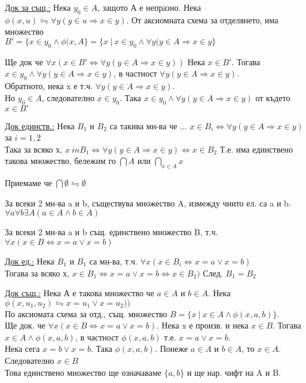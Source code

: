 \documentclass[fleqn, titlepage, 12pt]{report}
\begin{document}
\underline{Док за същ.:} Нека $y_0 \in A$, защото А е непразно. Нека
$\phi(x,u) \leftrightharpoons \forall{y}(y \in u \Rightarrow x \in y)$.
От аксиомната схема за отделянето, има множество\\
$B' = \{x \in y_0 \land \phi(x,A\} = \{x\ |\ x\in y_0 \land \forall{y}(y \in A \Rightarrow x \in y\}$

Ще док че $\forall{x}(x \in B' \Leftrightarrow \forall{y}(y \in A \Rightarrow x \in y))$
Нека $x \in B'$. Тогава $x \in y_0 \land \forall{y}(y \in A \Rightarrow x \in y)$,
в частност $ \forall{y}(y \in A \Rightarrow x \in y)$.\\
Обратното, нека x е т.ч. $ \forall{y}(y \in A  \Rightarrow x \in y)$.\\
Но $y_0 \in A$, следователно $x \in y_0$. Така $x \in y_0 \land \forall{y}(y \in A \Rightarrow x \in y)$
от където $x \in B'$
\bigbreak

\underline{Док единств.:} Нека $B_1$ и $B_2$ са такива мн-ва че ...
$ x \in B_i \Leftrightarrow \forall{y}(y \in A \Rightarrow x \in y)$ за $i = 1,2$\\
Така за всяко х, $ x\ in B_1 \Leftrightarrow \forall{y}(y \in A \Rightarrow x \in y) \Leftrightarrow x \in B_2$
Т.е. има единствено такова множество, бележим го $\bigcap A$ или $\bigcap_{x \in A}x$
\bigbreak

Приемаме че $\bigcap\emptyset \leftrightharpoons \emptyset$
\bigbreak

 За всеки 2 мн-ва a и b, съществува множество A, измежду чиито ел. са a и b.\\
$ \forall{a} \forall{b} \exists{A} (a \in A \land b \in A)$
\bigbreak

 За всеки 2 мн-ва a и b същ. единствено множество B, т.ч. $ \forall{x}(x \in B \Leftrightarrow x = a \lor x = b)$
\bigbreak

\underline{Док ед.:} Нека $B_1$ и $B_1$ са мн-ва, т.ч. $ \forall{x}(x \in B_i \Leftrightarrow x = a \lor x = b)$\\
Тогава за всяко х, $x \in B_1 \Leftrightarrow x = a \lor x = b \Leftrightarrow x \in B_2)$
След. $B_1 = B_2$
\bigbreak

\underline{Док същ.:} Нека А е такова множество че $a \in A$ и $ b \in A$.
Нека $ \phi(x, u_1, u_2) \leftrightharpoons x = u_1 \lor x = u_2))$\\
По аксиомата схема за отд., същ. множество $B = \{ x\ |\ x \in A \land \phi(x,a,b)\}$.\\
Ще док. че $ \forall{x}(x \in B \Leftrightarrow x = a \lor x = b)$. Нека x е произв. и нека $x \in B$.
Тогава $x \in A \land \phi(x,a,b)$, в частност $ \phi(x,a,b)$ т.е. $x = a \lor x = b$.\\
Нека сега $x = b \lor x = b$. Така $ \phi(x,a,b)$. Понеже $a \in A$ и $b \in A$, то $x \in A$. Следователно $x \in B$\\
Това единствено множество ще означаваме $\{a,b\}$ и ще нар. чифт на A и B.
\bigbreak
\end{document}
